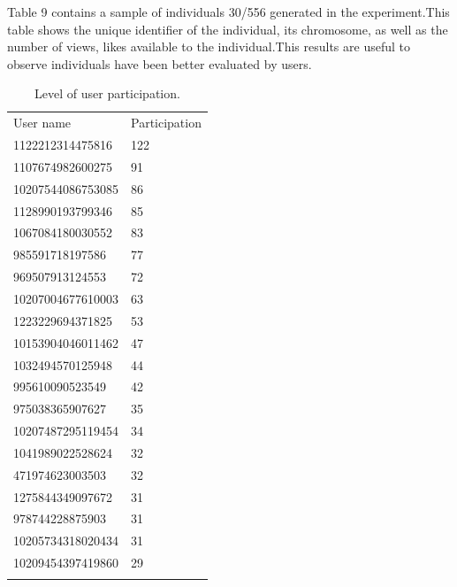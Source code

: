 Table 9 contains a sample of individuals 30/556 generated in the experiment.This
table shows the unique identifier of the individual, its chromosome, as well as
the number of views, likes available to the individual.This results are useful
to observe individuals have been better evaluated by users.

\begin{table}
\small
\caption{Level of user participation.}
\label{tab:userParticipation_2} 
\centering
\small
\begin{tabular}{p{4cm} p{4cm}}
\hline\noalign{\smallskip}
 User name & Participation   \\
\noalign{\smallskip}\hline\noalign{\smallskip}
\small{1122212314475816} & \small{122} \\ \hline 
\small{1107674982600275} & \small{91} \\ \hline 
\small{10207544086753085} & \small{86} \\ \hline 
\small{1128990193799346} & \small{85} \\ \hline 
\small{1067084180030552} & \small{83} \\ \hline 
\small{985591718197586} & \small{77} \\ \hline 
\small{969507913124553} & \small{72} \\ \hline 
\small{10207004677610003} & \small{63} \\ \hline 
\small{1223229694371825} & \small{53} \\ \hline 
\small{10153904046011462} & \small{47} \\ \hline 
\small{1032494570125948} & \small{44} \\ \hline 
\small{995610090523549} & \small{42} \\ \hline 
\small{975038365907627} & \small{35} \\ \hline
\small{10207487295119454} & \small{34} \\ \hline
\small{1041989022528624} & \small{32} \\ \hline
\small{471974623003503} & \small{32} \\ \hline
\small{1275844349097672} & \small{31} \\ \hline
\small{978744228875903} & \small{31} \\ \hline
\small{10205734318020434} & \small{31} \\ \hline
\small{10209454397419860} & \small{29} \\ \hline

    
\noalign{\smallskip}\hline
\end{tabular}
\end{table}







